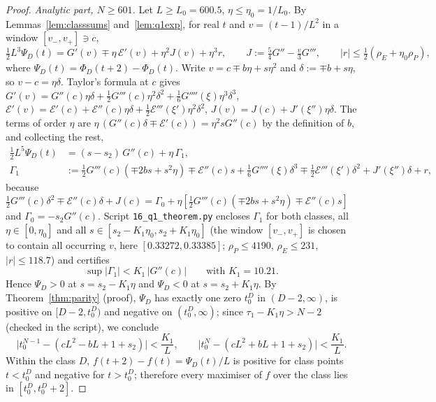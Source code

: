 \documentclass[11pt,a4paper]{article}
\theoremstyle{definition}
\theoremstyle{remark}
\begin{document}
\begin{proof}
\emph{Analytic part, $N\ge601$.} Let $L\ge L_0=600.5$, $\eta\le\eta_0=1/L_0$. By Lemmas~\ref{lem:classsums}
and~\ref{lem:q1exp}, for real $t$ and $v=(t-1)/L^2$ in a window $[v_-,v_+]\ni c$,
\begin{equation}\label{eq:q1incr}
  \tfrac12L^3\Psi_D(t)=G'(v)\mp\eta\,\mathcal E'(v)+\eta^2J(v)+\eta^3r,\qquad J:=\tfrac54G''-\tfrac v3G''',\qquad
  |r|\le\tfrac12(\rho_E+\eta_0\rho_P),
\end{equation}
where $\Psi_D(t)=\Phi_D(t+2)-\Phi_D(t)$. Write $v=c\mp b\eta+s\eta^2$ and $\delta:=\mp b+s\eta$, so $v-c=\eta\delta$.
Taylor's formula at $c$ gives $G'(v)=G''(c)\eta\delta+\frac12G'''(c)\eta^2\delta^2+\frac16G''''(\xi)\eta^3\delta^3$,
$\mathcal E'(v)=\mathcal E'(c)+\mathcal E''(c)\eta\delta+\frac12\mathcal E'''(\xi')\eta^2\delta^2$,
$J(v)=J(c)+J'(\xi'')\eta\delta$. The terms of order $\eta$ are $\eta\,(G''(c)\delta\mp\mathcal E'(c))=\eta^2sG''(c)$ by
the definition of $b$, and collecting the rest,
\begin{equation}\label{eq:q1Gamma}
\begin{aligned}
  \tfrac12L^5\Psi_D(t)&=(s-s_2)\,G''(c)+\eta\,\Gamma_1,\\
  \Gamma_1&:=\tfrac12G'''(c)(\mp2bs+s^2\eta)\mp\mathcal E''(c)s+\tfrac16G''''(\xi)\delta^3\mp\tfrac12\mathcal E'''(\xi')\delta^2
     +J'(\xi'')\delta+r ,
\end{aligned}
\end{equation}
because $\frac12G'''(c)\delta^2\mp\mathcal E''(c)\delta+J(c)=\Gamma_0+\eta[\frac12G'''(c)(\mp2bs+s^2\eta)\mp\mathcal E''(c)s]$
and $\Gamma_0=-s_2G''(c)$. Script \texttt{16\_q1\_theorem.py} encloses $\Gamma_1$ for both classes, all
$\eta\in[0,\eta_0]$ and all $s\in[s_2-K_1\eta_0,s_2+K_1\eta_0]$ (the window $[v_-,v_+]$ is chosen to contain all
occurring $v$, here $[0.33272,0.33385]$; $\rho_P\le4190$, $\rho_E\le231$, $|r|\le118.7$) and certifies
\[
   \sup|\Gamma_1|<K_1\,|G''(c)|\qquad\text{with }K_1=10.21 .
\]
Hence $\Psi_D>0$ at $s=s_2-K_1\eta$ and $\Psi_D<0$ at $s=s_2+K_1\eta$. By Theorem~\ref{thm:parity} (proof),
$\Psi_D$ has exactly one zero $t_0^D$ in $(D-2,\infty)$, is positive on $[D-2,t_0^D)$ and negative on
$(t_0^D,\infty)$; since $\tau_1-K_1\eta>N-2$ (checked in the script), we conclude
\[
  \bigl|t_0^{N-1}-(cL^2-bL+1+s_2)\bigr|<\frac{K_1}L,\qquad\bigl|t_0^{N}-(cL^2+bL+1+s_2)\bigr|<\frac{K_1}L .
\]
Within the class $D$, $f(t+2)-f(t)=\Psi_D(t)/L$ is positive for class points $t<t_0^D$ and negative for
$t>t_0^D$; therefore every maximiser of $f$ over the class lies in $[t_0^D,t_0^D+2]$.


\end{proof}
\end{document}
